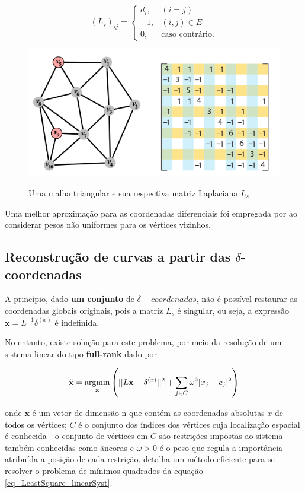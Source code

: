 \documentclass[
	12pt,				%
	oneside,			%
	a4paper,			%
	sumario=tradicional,
	english,			%
	french,				%
	spanish,			%
	brazil,				%
]{abntex2}
\DeclareMathOperator*{\argmin}{argmin}
\begin{document}
\begin{equation}
    (L_s)_{ij} = \begin{cases}
        d_i, & (i = j)\\
        -1, & (i,j) \in E \\
         0, & \text{caso contrário}.
        \end{cases}
     \label{eq_laplacianaSimet}
\end{equation}

\begin{figure}[htb]
\centering
    \caption{Uma malha triangular e sua respectiva matriz Laplaciana $L_s$}
    \includegraphics[width=.5\linewidth]{./img/meshLaplacian.png}
    \label{fig:matrizLaplaciana}
\end{figure}


Uma melhor aproximação para as coordenadas diferenciais foi empregada por \cite{Pinkall1993} ao considerar pesos não uniformes para os vértices vizinhos. 


\subsection{Reconstrução de curvas a partir das \texorpdfstring{$\delta$} --coordenadas}

A princípio, dado \textbf{um conjunto} de $\delta-coordenadas$, não é possível restaurar as coordenadas globais originais, pois a matriz $L_s$ é singular, ou seja, a expressão $\mathbf{x} = L^{-1} \delta^{(x)}$ é indefinida. 

No entanto, existe solução para este problema, por meio da resolução de um sistema linear do tipo \textbf{full-rank} dado por 


\begin{equation}
    \Tilde{\mathbf{x}} = \argmin_\mathbf{x} \left( ||L\mathbf{x} - \delta^{(x)}||^2 + \sum_{j \in C} \omega^2 |x_j - c_j|^2 \right)
    \label{eq_LeastSquare_linearSyst}
\end{equation}

\noindent onde $\mathbf{x}$ é um vetor de dimensão n que contém as coordenadas absolutas $x$ de todos os vértices; $C$ é o conjunto dos índices dos vértices cuja localização espacial é conhecida - o conjunto de vértices em $C$ são restrições impostas ao sistema - também conhecidas como âncoras e $\omega > 0$ é o peso que regula a importância atribuída a posição de cada restrição.  detalha um método eficiente para se resolver o problema de mínimos quadrados da equação \ref{eq_LeastSquare_linearSyst}. 
\end{document}
